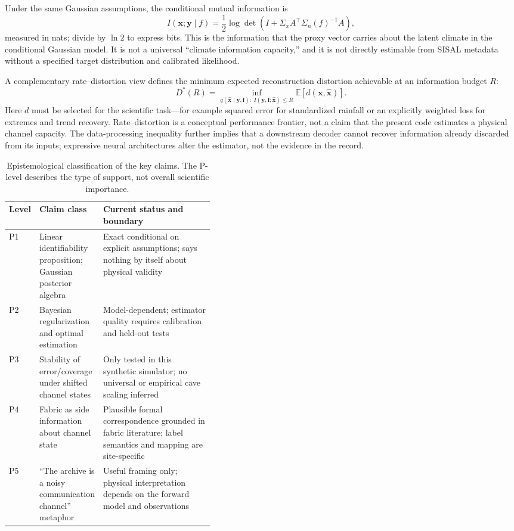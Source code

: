 \documentclass[11pt,a4paper]{article}
\begin{document}
Under the same Gaussian assumptions, the conditional mutual information is
\begin{equation}\label{eq:info}
I(\mathbf x;\mathbf y\mid f)=\frac12\log\det\!\left(I+\Sigma_x A^\top\Sigma_n(f)^{-1}A\right),
\end{equation}
measured in nats; divide by $\ln 2$ to express bits. This is the information that the proxy vector carries about the latent climate in the conditional Gaussian model. It is not a universal “climate information capacity,” and it is not directly estimable from SISAL metadata without a specified target distribution and calibrated likelihood.

A complementary rate--distortion view defines the minimum expected reconstruction distortion achievable at an information budget $R$:
\begin{equation}\label{eq:rd}
D^*(R)=\inf_{q(\hat{\mathbf x}\mid\mathbf y,\mathbf f):\ I(\mathbf y,\mathbf f;\hat{\mathbf x})\le R}
\mathbb E\left[d(\mathbf x,\hat{\mathbf x})\right].
\end{equation}
Here $d$ must be selected for the scientific task—for example squared error for standardized rainfall or an explicitly weighted loss for extremes and trend recovery. Rate--distortion is a conceptual performance frontier, not a claim that the present code estimates a physical channel capacity. The data-processing inequality further implies that a downstream decoder cannot recover information already discarded from its inputs; expressive neural architectures alter the estimator, not the evidence in the record.

\begin{table}[!htbp]\centering\small
\caption{Epistemological classification of the key claims. The P-level describes the type of support, not overall scientific importance.}\label{tab:epistemic}
\begin{tabularx}{\linewidth}{p{0.10\linewidth}p{0.30\linewidth}X}\toprule
Level & Claim class & Current status and boundary \\\midrule
P1 & Linear identifiability proposition; Gaussian posterior algebra & Exact conditional on explicit assumptions; says nothing by itself about physical validity \\
P2 & Bayesian regularization and optimal estimation & Model-dependent; estimator quality requires calibration and held-out tests \\
P3 & Stability of error/coverage under shifted channel states & Only tested in this synthetic simulator; no universal or empirical cave scaling inferred \\
P4 & Fabric as side information about channel state & Plausible formal correspondence grounded in fabric literature; label semantics and mapping are site-specific \\
P5 & “The archive is a noisy communication channel” metaphor & Useful framing only; physical interpretation depends on the forward model and observations \\
\bottomrule\end{tabularx}\end{table}
\end{document}
